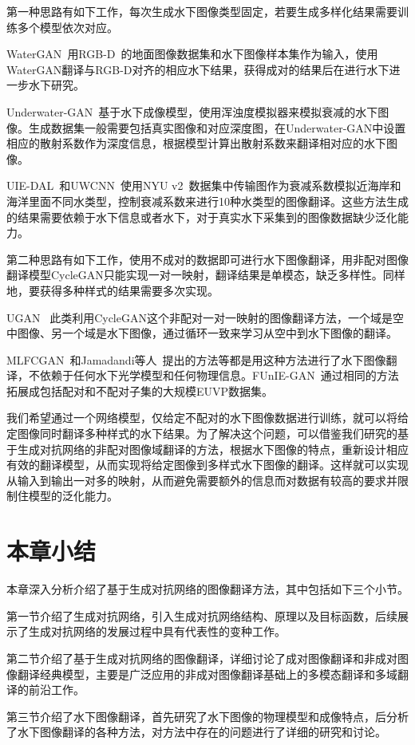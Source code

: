 
第一种思路有如下工作，每次生成水下图像类型固定，若要生成多样化结果需要训练多个模型依次对应。

WaterGAN~\cite{li2017watergan}用RGB-D~\cite{janoch2013category,lai2014unsupervised,silberman2011indoor,shotton2013scene}的地面图像数据集和水下图像样本集作为输入，使用WaterGAN翻译与RGB-D对齐的相应水下结果，获得成对的结果后在进行水下进一步水下研究。

Underwater-GAN~\cite{yu2018underwater}基于水下成像模型，使用浑浊度模拟器来模拟衰减的水下图像。生成数据集一般需要包括真实图像和对应深度图，在Underwater-GAN中设置相应的散射系数作为深度信息，根据模型计算出散射系数来翻译相对应的水下图像。

UIE-DAL~\cite{uplavikar2019all}和UWCNN~\cite{li2020underwater}使用NYU v2~\cite{silberman2012indoor}数据集中传输图作为衰减系数模拟近海岸和海洋里面不同水类型，控制衰减系数来进行10种水类型的图像翻译。这些方法生成的结果需要依赖于水下信息或者水下，对于真实水下采集到的图像数据缺少泛化能力。

第二种思路有如下工作，使用不成对的数据即可进行水下图像翻译，用非配对图像翻译模型CycleGAN只能实现一对一映射，翻译结果是单模态，缺乏多样性。同样地，要获得多种样式的结果需要多次实现。

UGAN~
\cite{fabbri2018enhancing}此类利用CycleGAN这个非配对一对一映射的图像翻译方法，一个域是空中图像、另一个域是水下图像，通过循环一致来学习从空中到水下图像的翻译。

MLFCGAN~\cite{liu2019mlfCGAN}和Jamadandi等人~\cite{jamadandi2019exemplar}提出的方法等都是用这种方法进行了水下图像翻译，不依赖于任何水下光学模型和任何物理信息。FUnIE-GAN~\cite{islam2020fast}通过相同的方法拓展成包括配对和不配对子集的大规模EUVP数据集。

我们希望通过一个网络模型，仅给定不配对的水下图像数据进行训练，就可以将给定图像同时翻译多种样式的水下结果。为了解决这个问题，可以借鉴我们研究的基于生成对抗网络的非配对图像域翻译的方法，根据水下图像的特点，重新设计相应有效的翻译模型，从而实现将给定图像到多样式水下图像的翻译。这样就可以实现从输入到输出一对多的映射，从而避免需要额外的信息而对数据有较高的要求并限制住模型的泛化能力。

\section{本章小结}
本章深入分析介绍了基于生成对抗网络的图像翻译方法，其中包括如下三个小节。

第一节介绍了生成对抗网络，引入生成对抗网络结构、原理以及目标函数，后续展示了生成对抗网络的发展过程中具有代表性的变种工作。

第二节介绍了基于生成对抗网络的图像翻译，详细讨论了成对图像翻译和非成对图像翻译经典模型，主要是广泛应用的非成对图像翻译基础上的多模态翻译和多域翻译的前沿工作。

第三节介绍了水下图像翻译，首先研究了水下图像的物理模型和成像特点，后分析了水下图像翻译的各种方法，对方法中存在的问题进行了详细的研究和讨论。